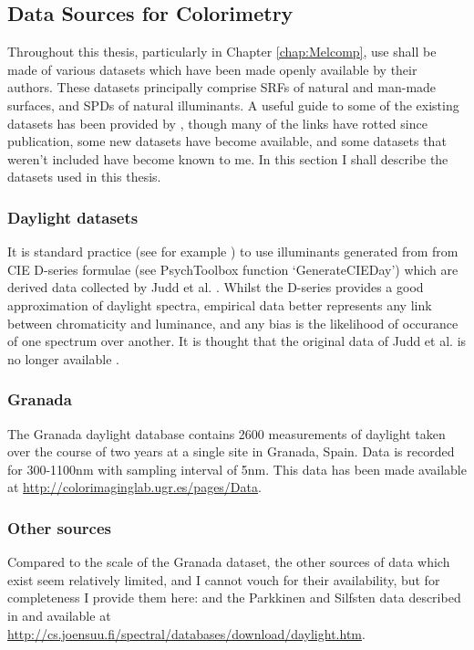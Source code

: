 \subsection{Data Sources for Colorimetry}

Throughout this thesis, particularly in Chapter \ref{chap:Melcomp}, use shall be made of various datasets which have been made openly available by their authors. These datasets principally comprise \glspl{SRF} of natural and man-made surfaces, and \glspl{SPD} of natural illuminants. A useful guide to some of the existing datasets has been provided by \citet{kohonen_databases_2006}, though many of the links have rotted since publication, some new datasets have become available, and some datasets that weren't included have become known to me. In this section I shall describe the datasets used in this thesis.

\subsubsection{Daylight datasets}

It is standard practice (see for example \cite{barrionuevo_contributions_2014}) to use illuminants generated from from CIE D-series formulae (see PsychToolbox function `GenerateCIEDay') which are derived data collected by Judd et al. \cite{judd_spectral_1964}. Whilst the D-series provides a good approximation of daylight spectra, empirical data better represents any link between chromaticity and luminance, and any bias is the likelihood of occurance of one spectrum over another. It is thought that the original data of Judd et al. is no longer available \cite[p.~60]{maloney_computational_1984}.

\subsubsection*{Granada \cite{hernandez-andres_color_2001}}
The Granada daylight database contains 2600 measurements of daylight taken over the course of two years at a single site in Granada, Spain. Data is recorded for 300-1100nm with sampling interval of 5nm. This data has been made available at \url{http://colorimaginglab.ugr.es/pages/Data}.

\subsubsection*{Other sources}
Compared to the scale of the Granada dataset, the other sources of data which exist seem relatively limited, and I cannot vouch for their availability, but for completeness I provide them here: \cite{condit_spectral_1964, tarrant_spectral_1968} and the Parkkinen and Silfsten data described in \cite{kohonen_databases_2006} and available at \url{http://cs.joensuu.fi/spectral/databases/download/daylight.htm}. 

